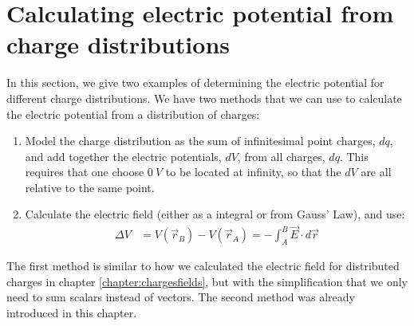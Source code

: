 \section{Calculating electric potential from charge distributions}
In this section, we give two examples of determining the electric potential for different charge distributions. We have two methods that we can use to calculate the electric potential from a distribution of charges:
\begin{enumerate}
\item Model the charge distribution as the sum of infinitesimal point charges, $dq$, and add together the electric potentials, $dV$, from all charges, $dq$. This requires that one choose $\SI{0}{V}$ to be located at infinity, so that the $dV$ are all relative to the same point.
\item Calculate the electric field (either as a integral or from Gauss' Law), and use:
\begin{align*}
\Delta V &=V(\vec r_B)-V(\vec r_A)=-\int_A^B  \vec E\cdot d\vec r
\end{align*}
\end{enumerate}
The first method is similar to how we calculated the electric field for distributed charges in chapter \ref{chapter:chargesfields}, but with the simplification that we only need to sum scalars instead of vectors. The second method was already introduced in this chapter.
